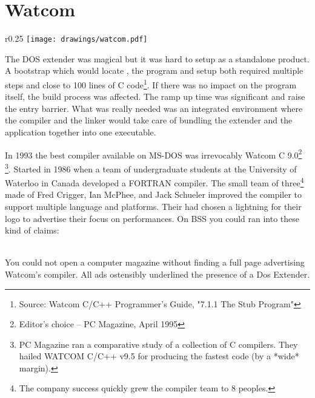 \section{Watcom}

\begin{wrapfigure}[9]{r}{0.25\textwidth}
\centering
\texttt{[image: drawings/watcom.pdf]}
\end{wrapfigure}


The DOS extender was magical but it was hard to setup as a standalone product. A bootstrap which would locate , the program and setup both required multiple steps and close to 100 lines of C code\footnote{Source: Watcom C/C++ Programmer's Guide, "7.1.1 The Stub Program"}. If there was no impact on the program itself, the build process was affected. The ramp up time was significant and raise the entry barrier. What was really needed was an integrated environment where the compiler and the linker would take care of bundling the extender and the application together into one executable.\\ 
\par

In 1993 the best compiler available on MS-DOS was irrevocably Watcom C 9.0\footnote{Editor's choice -- PC Magazine, April 1995} \footnote{PC Magazine ran a comparative study of a collection of C compilers.  They hailed WATCOM C/C++ v9.5 for producing the fastest code (by a *wide* margin).}. Started in 1986 when a team of undergraduate students at the University of Waterloo in Canada developed a FORTRAN compiler. The small team of three\footnote{The company success quickly grew the compiler team to 8 peoples.} made of Fred Crigger, Ian McPhee, and Jack Schueler improved the compiler to support multiple language and platforms. Their had chosen a lightning for their logo to advertise their focus on performances. On BSS you could ran into these kind of claims:\\
\par
{}
\\
You could not open a computer magazine without finding a full page advertising Watcom's compiler. All ads ostensibly underlined the presence of a Dos Extender.
\par
{}
\par
{}
\par

